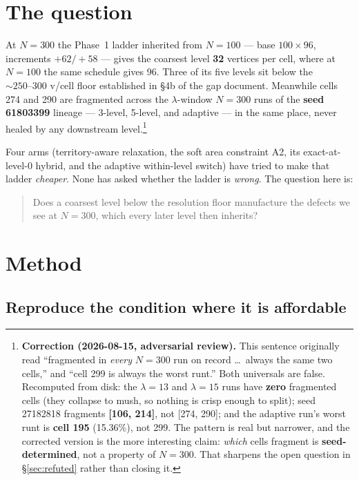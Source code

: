 \documentclass[11pt,a4paper]{article}
\begin{document}
\tableofcontents
\newpage

\section{The question}
\label{sec:question}

At \(N{=}300\) the Phase~1 ladder inherited from \(N{=}100\) --- base
\(100{\times}96\), increments \(+62/+58\) --- gives the coarsest level
\textbf{32} vertices per cell, where at \(N{=}100\) the same schedule gives 96.
Three of its five levels sit below the \(\sim\!250\text{--}300\) v/cell floor
established in \S4b of the gap document. Meanwhile cells 274 and 290 are
fragmented across the \(\lambda\)-window \(N{=}300\) runs of the \textbf{seed
61803399} lineage --- 3-level, 5-level, and adaptive --- in the same place, never
healed by any downstream level.\footnote{\textbf{Correction (2026-08-15,
adversarial review).} This sentence originally read ``fragmented in \emph{every}
\(N{=}300\) run on record \ldots\ always the same two cells,'' and ``cell 299 is
always the worst runt.'' Both universals are false. Recomputed from disk: the
\(\lambda{=}13\) and \(\lambda{=}15\) runs have \textbf{zero} fragmented cells
(they collapse to mush, so nothing is crisp enough to split); seed 27182818
fragments \textbf{[106, 214]}, not [274, 290]; and the adaptive run's worst runt
is \textbf{cell 195} (15.36\%), not 299. The pattern is real but narrower, and
the corrected version is the more interesting claim: \emph{which} cells fragment
is \textbf{seed-determined}, not a property of \(N{=}300\). That sharpens the
open question in \S\ref{sec:refuted} rather than closing it.}

Four arms (territory-aware relaxation, the soft area constraint A2, its
exact-at-level-0 hybrid, and the adaptive within-level switch) have tried to make
that ladder \emph{cheaper}. None has asked whether the ladder is \emph{wrong}.
The question here is:

\begin{quote}
Does a coarsest level below the resolution floor manufacture the defects we see
at \(N{=}300\), which every later level then inherits?
\end{quote}

\section{Method}
\label{sec:method}

\subsection{Reproduce the condition where it is affordable}
\end{document}
